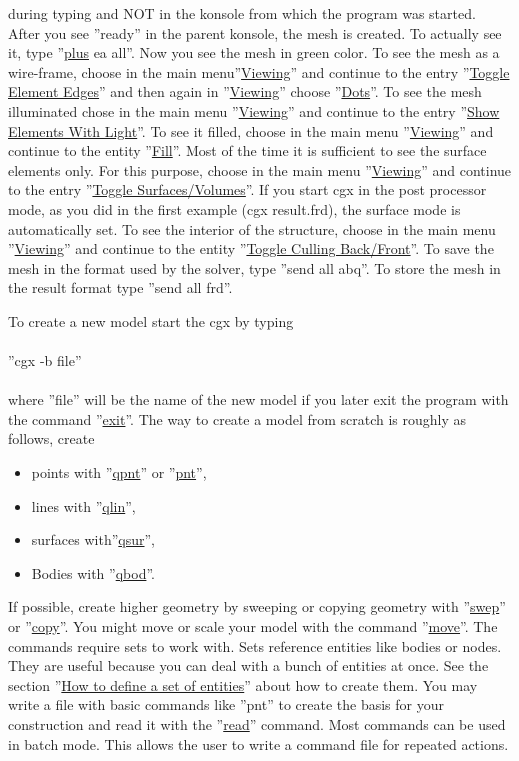 \documentclass{article}
\providecommand{\htmlref}[2]{\hyperref[#2]{#1}}
\begin{document}
during typing and NOT in the konsole from which the program was started. After you see ''ready'' in the parent konsole, the mesh is created. To actually see it, type ''\htmlref{plus}{plus} ea all''. Now you see the mesh in green color. To see the mesh as a wire-frame, choose in the main menu''\htmlref{Viewing}{Viewing}'' and continue to the entry ''\htmlref{Toggle Element Edges}{Toggle Element Edges}'' and then again in ''\htmlref{Viewing}{Viewing}'' choose ''\htmlref{Dots}{Dots}''. To see the mesh illuminated chose in the main menu ''\htmlref{Viewing}{Viewing}'' and continue to the entry ''\htmlref{Show Elements With Light}{Show Elements With Light}''. To see it filled, choose in the main menu ''\htmlref{Viewing}{Viewing}'' and continue to the entity ''\htmlref{Fill}{Fill}''. Most of the time it is sufficient to see the surface elements only. For this purpose, choose in the main menu ''\htmlref{Viewing}{Viewing}'' and continue to the entry ''\htmlref{Toggle Surfaces/Volumes}{Toggle Surfaces/Volumes}''. If you start cgx in the post processor mode, as you did in the first example (cgx result.frd), the surface mode is automatically set. To see the interior of the structure, choose in the main menu ''\htmlref{Viewing}{Viewing}'' and continue to the entity ''\htmlref{Toggle Culling Back/Front}{Toggle Culling Back/Front}''. To save the mesh in the format used by the solver, type ''send all abq''. To store the mesh in the result format type ''send all frd''. 

To create a new model start the cgx by typing\\\\  ''cgx -b file''\\\\where ''file'' will be the name of the new model if you later exit the program with the command ''\htmlref{exit}{exit}''. The way to create a model from scratch is roughly as follows, create
\begin{itemize}
\item points with ''\htmlref{qpnt}{qpnt}'' or ''\htmlref{pnt}{pnt}'',
\item lines with ''\htmlref{qlin}{qlin}'',
\item surfaces with''\htmlref{qsur}{qsur}'',
\item Bodies with ''\htmlref{qbod}{qbod}''.
\end{itemize}
If possible, create higher geometry by sweeping or copying geometry with ''\htmlref{swep}{swep}'' or ''\htmlref{copy}{copy}''. You might move or scale your model with the command ''\htmlref{move}{move}''. The commands require sets to work with. Sets reference entities like bodies or nodes. They are useful because you can deal with a bunch of entities at once. See the section ''\htmlref{How to define a set of entities}{How to define a set of entities}'' about how to create them.
You may write a file with basic commands like ''pnt'' to create the basis for your construction and read it with the ''\htmlref{read}{read}'' command. Most commands can be used in batch mode. This allows the user to write a command file for repeated actions.
\end{document}
